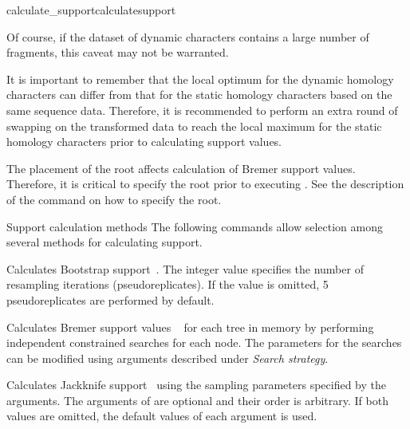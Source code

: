 \begin{command}{calculate\_support}{calculatesupport}
\begin{statement}
 \setlength{\parindent}{0.5cm}                                
                \indent Of course, 
                if the dataset of dynamic characters contains a large number of fragments, 
                this caveat may not be warranted.
                
 \setlength{\parindent}{0.5cm}                                
                \indent It is important to remember that the local optimum for the dynamic
                homology characters can differ from that for the static homology characters
                based on the same sequence data. Therefore, it is recommended to perform 
                an extra round of swapping on the transformed data to reach the local 
                maximum for the static homology characters prior to calculating support values.
            \end{statement}
          
 \begin{statement}
	The placement of the root affects calculation of Bremer support values.
	  Therefore, it is critical to specify the root prior to executing
	  . See the description of the
	  command  on how to specify the root.
	\end{statement}          
                       
        
              
	\begin{arguments}
		\begin{argumentgroup}{Support calculation methods}
            {The following commands allow selection among several methods for
            calculating support.} 

                {Calculates Bootstrap support~\cite{Felsenstein1985}. 
                The integer value specifies
                the number of resampling iterations (pseudoreplicates). If the value
                is omitted, 5 pseudoreplicates are performed by default.} 
                {}
                
                {Calculates Bremer support values ~\cite{Bremer1988, Kallersjoetal1992}
                for each tree in memory by performing independent constrained searches for each
                node. The parameters for the searches can be modified using arguments
                described under \emph{Search strategy}.} 
                {}
  
                {Calculates Jackknife support~\cite{Farrisetal1996} using the 
                sampling parameters specified by the arguments. The arguments of
                 are optional and their order is arbitrary. If
                both values are omitted, the default values of each argument is used.}
                {}
        

\end{argumentgroup}
\end{arguments}
\end{command}

